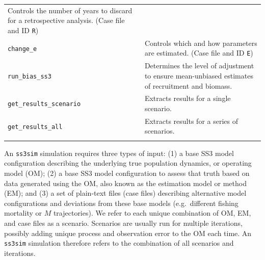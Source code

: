 \documentclass[11pt]{article}
\begin{document}
\begin{small}
\begin{longtable}[c]{@{}ll@{}}
\begin{minipage}[t]{0.57\columnwidth}
Controls the number of years to discard for a retrospective analysis. (Case file and ID \texttt{R})
\end{minipage}
\\\noalign{\medskip}
\begin{minipage}[t]{0.32\columnwidth}\raggedright
\texttt{change\_e}
\end{minipage} & \begin{minipage}[t]{0.57\columnwidth}\raggedright
Controls which and how parameters are estimated. (Case file and ID \texttt{E})
\end{minipage}
\\\noalign{\medskip}
\begin{minipage}[t]{0.32\columnwidth}\raggedright
\texttt{run\_bias\_ss3}
\end{minipage} & \begin{minipage}[t]{0.57\columnwidth}\raggedright
Determines the level of adjustment to ensure mean-unbiased estimates of recruitment and biomass.
\end{minipage}
\\\noalign{\medskip}
\begin{minipage}[t]{0.32\columnwidth}\raggedright
\texttt{get\_results\_scenario}
\end{minipage} & \begin{minipage}[t]{0.57\columnwidth}\raggedright
Extracts results for a single scenario.
\end{minipage}
\\\noalign{\medskip}
\begin{minipage}[t]{0.32\columnwidth}\raggedright
\texttt{get\_results\_all}
\end{minipage} & \begin{minipage}[t]{0.57\columnwidth}\raggedright
Extracts results for a series of scenarios.
\end{minipage}
\\\noalign{\medskip}
\hline
\end{longtable}
\end{small}

An \texttt{ss3sim} simulation requires three types of input: (1) a base SS3 model configuration describing the underlying true population dynamics, or operating model (OM); (2) a base SS3 model configuration to assess that truth based on data generated using the OM, also known as the estimation model or method (EM); and (3) a set of plain-text files (case files) describing alternative model configurations and deviations from these base models (e.g.~different fishing mortality or $M$ trajectories). We refer to each unique combination of OM, EM, and case files as a scenario. Scenarios are usually run for multiple iterations, possibly adding unique process and observation error to the OM each time. An \texttt{ss3sim} simulation therefore refers to the combination of all scenarios and iterations.
\end{document}
